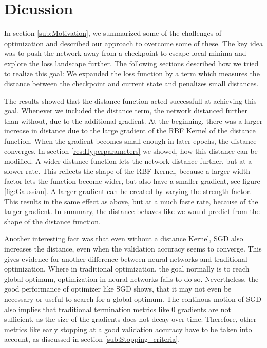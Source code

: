 \chapter{Dicussion}

In section \ref{sub:Motivation}, we summarized some of the challenges of
optimization and described our approach to overcome some of these. The key idea
was to push the network away from a checkpoint to escape local minima and
explore the loss landscape further. The following sections described how we
tried to realize this goal: We expanded the loss function by a term which
measures the distance between the checkpoint and current state and penalizes
small distances.

The results showed that the distance function acted successfull at achieving
this goal. Whenever we included the distance term, the network distanced further
than without, due to the additional gradient. At the beginning, there was a
larger increase in distance due to the large gradient of the RBF Kernel of the
distance function. When the gradient becomes small enough in later epochs, the
distance converges. In section \ref{res:Hyperparameters} we showed, how this
distance can be modified. A wider distance function lets the network distance
further, but at a slower rate. This reflects the shape of the RBF Kernel,
because a larger width factor lets the function become wider, but also have a
smaller gradient, see figure \ref{fig:Gaussian}. A larger gradient can be
created by varying the strength factor. This results in the same effect as
above, but at a much faste rate, because of the larger gradient. In summary, the
distance behaves like we would predict from the shape of the distance function.


Another interesting fact was that even without a distance Kernel,
SGD also increases the distance, even when the validation accuracy seems to
converge. This gives evidence for another difference between neural networks and
traditional optimization. Where in traditional optimization, the goal normally
is to reach global optimum, optimization in neural networks fails to do so.
Nevertheless, the good performance of optimizer like SGD shows, that it may not
even be necessary or useful to search for a global optimum. The continous motion
of SGD also implies that traditional termination metrics like 0 gradients are
not sufficient, as the size of the gradients does not decay over time. Therefore,
other metrics like early stopping at a good validation accuracy have to be taken
into account, as discussed in section \ref{sub:Stopping_criteria}.
\newline

